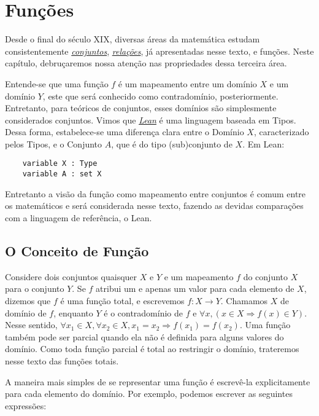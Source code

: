 \chapter{Funções}

Desde o final do século XIX, diversas áreas da matemática 
estudam consistentemente \textit{\hyperlink{chapter.4}{conjuntos}}, 
\textit{\hyperlink{chapter.5}{relações}}, já apresentadas 
nesse texto, e funções. Neste capítulo, debruçaremos nossa 
atenção nas propriedades dessa terceira área. 

Entende-se que uma função $f$ é um mapeamento entre um 
domínio $X$ e um domínio $Y$, este que será conhecido como 
contradomínio, posteriormente. Entretanto, para teóricos 
de conjuntos, esses domínios são simplesmente considerados 
conjuntos. Vimos que \textit{\hyperlink{chapter.2}{Lean}} é uma 
linguagem baseada em Tipos. Dessa forma, estabelece-se uma 
diferença clara entre o Domínio $X$, caracterizado pelos Tipos, e
o Conjunto $A$, que é do tipo (sub)conjunto de $X$. Em Lean: 
\begin{lstlisting}
    variable X : Type
    variable A : set X    
\end{lstlisting}

Entretanto a visão da função como mapeamento entre conjuntos
é comum entre os matemáticos e será considerada nesse texto,
fazendo as devidas comparações com a linguagem de referência, 
o Lean. 

\section{O Conceito de Função}

Considere dois conjuntos quaisquer $X$ e $Y$ e um mapeamento $f$ 
do conjunto $X$ para o conjunto $Y$. Se $f$ atribui um e apenas 
um valor para cada elemento de $X$, dizemos que $f$ é uma função total, e
escrevemos $f: X \to Y$.  Chamamos $X$ de domínio de $f$, enquanto 
$Y$ é o contradomínio de $f$ e $\forall x, (x \in X  \Rightarrow f(x) \in Y)$. 
Nesse sentido, $\forall x_1 \in X, \forall x_2 \in X, x_1 = x_2 \Rightarrow f(x_1) = f(x_2)$.
Uma função também pode ser parcial quando ela não é definida para alguns valores 
do domínio. Como toda função parcial é total ao restringir o domínio, trateremos 
nesse texto das funções totais. 

A maneira mais simples de se representar uma função é escrevê-la explicitamente 
para cada elemento do domínio. Por exemplo, podemos escrever as seguintes expressões:

